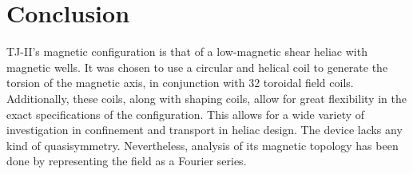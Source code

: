 \documentclass[a4paper, 12pt]{article}
\begin{document}

\section*{Conclusion}
TJ-II's magnetic configuration is that of a low-magnetic shear heliac with magnetic wells. It was chosen to use a circular and helical coil to generate the torsion of the magnetic axis, in conjunction with 32 toroidal field coils. Additionally, these coils, along with shaping coils, allow for great flexibility in the exact specifications of the configuration. This allows for a wide variety of investigation in confinement and transport in heliac design. The device lacks any kind of quasisymmetry. Nevertheless, analysis of its magnetic topology has been done by representing the field as a Fourier series.




\end{document}
